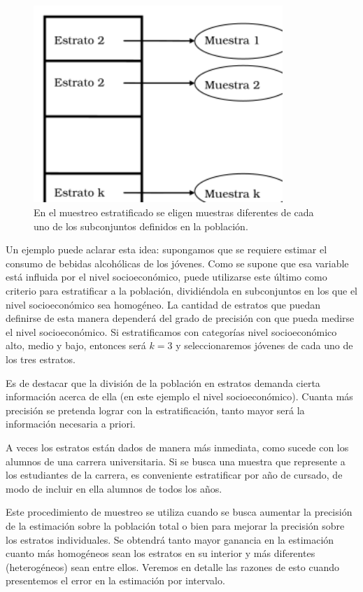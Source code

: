 \documentclass[]{book}
\begin{document}
\begin{figure}

{\centering \includegraphics[width=3.71in]{imagenes/image87} 

}

\caption{En el muestreo estratificado se eligen muestras diferentes de cada uno de los subconjuntos definidos en la población.}\label{fig:unnamed-chunk-222}
\end{figure}

Un ejemplo puede aclarar esta idea: supongamos que se requiere estimar
el consumo de bebidas alcohólicas de los jóvenes. Como se supone que esa
variable está influida por el nivel socioeconómico, puede utilizarse
este último como criterio para estratificar a la población, dividiéndola
en subconjuntos en los que el nivel socioeconómico sea homogéneo. La
cantidad de estratos que puedan definirse de esta manera dependerá del
grado de precisión con que pueda medirse el nivel socioeconómico. Si
estratificamos con categorías nivel socioeconómico alto, medio y bajo,
entonces será \(k=3\) y seleccionaremos jóvenes de cada uno de los tres
estratos.

Es de destacar que la división de la población en estratos demanda
cierta información acerca de ella (en este ejemplo el nivel
socioeconómico). Cuanta más precisión se pretenda lograr con la
estratificación, tanto mayor será la información necesaria a priori.

A veces los estratos están dados de manera más inmediata, como sucede
con los alumnos de una carrera universitaria. Si se busca una muestra
que represente a los estudiantes de la carrera, es conveniente
estratificar por año de cursado, de modo de incluir en ella alumnos de
todos los años.

Este procedimiento de muestreo se utiliza cuando se busca aumentar la
precisión de la estimación sobre la población total o bien para mejorar
la precisión sobre los estratos individuales. Se obtendrá tanto mayor
ganancia en la estimación cuanto más homogéneos sean los estratos en su
interior y más diferentes (heterogéneos) sean entre ellos. Veremos en
detalle las razones de esto cuando presentemos el error en la estimación
por intervalo.
\end{document}
